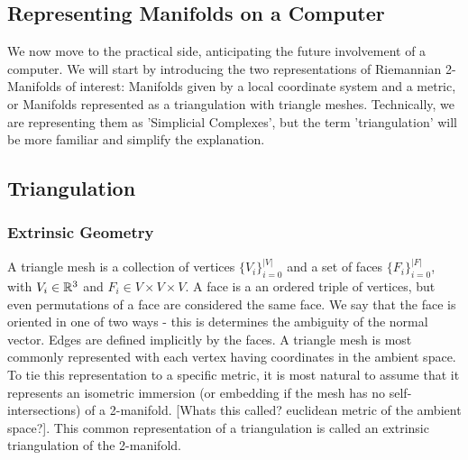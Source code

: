 \subsection*{Representing Manifolds on a Computer}
We now move to the practical side, anticipating the future involvement of a computer. We will start by introducing the two representations of Riemannian 2-Manifolds of interest: Manifolds given by a local coordinate system and a metric, or Manifolds represented as a triangulation with triangle meshes. Technically, we are representing them as 'Simplicial Complexes', but the term 'triangulation' will be more familiar and simplify the explanation.
\subsection*{Triangulation}
\subsubsection*{Extrinsic Geometry}
A triangle mesh is a collection of vertices $\{V_i\}_{i=0}^{|V|}$ and a set of faces $\{F_i\}_{i=0}^{|F|}$, with $V_i \in \mathbb{R}^3$ and $F_i \in V \times V \times V$. A face is a an ordered triple of vertices, but even permutations of a face are considered the same face. We say that the face is oriented in one of two ways - this is determines the ambiguity of the normal vector. Edges are defined implicitly by the faces.
A triangle mesh is most commonly represented with each vertex having coordinates in the ambient space. To tie this representation to a specific metric, it is most natural to assume that it represents an isometric immersion (or embedding if the mesh has no self-intersections) of a 2-manifold. [Whats this called? euclidean metric of the ambient space?]. This common representation of a triangulation is called an extrinsic triangulation of the 2-manifold.
